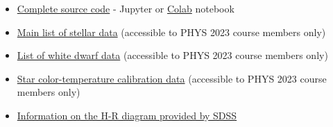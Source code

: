 \documentclass[twocolumn]{aastex63}
\begin{document}
\begin{itemize}
    \item \href{https://drive.google.com/file/d/1skbQMEpihvruBT3py0GIvwL7lylB5EGR/view?usp=sharing}{Complete source code} - Jupyter or \href{https://colab.research.google.com/}{Colab} notebook \citep[requires IPython:][]{IPython}
    \item \href{https://blackboard.gwu.edu/bbcswebdav/pid-9747006-dt-content-rid-65358190_2/xid-65358190_2}{Main list of stellar data} (accessible to PHYS 2023 course members only)
    \item \href{https://blackboard.gwu.edu/bbcswebdav/pid-9747009-dt-content-rid-65358195_2/xid-65358195_2}{List of white dwarf data} (accessible to PHYS 2023 course members only)
    \item \href{https://blackboard.gwu.edu/bbcswebdav/pid-9747011-dt-content-rid-65358198_2/xid-65358198_2}{Star color-temperature calibration data} (accessible to PHYS 2023 course members only)
    \item \href{https://skyserver.sdss.org/dr15/en/proj/advanced/hr/hrhome.aspx}{Information on the H-R diagram provided by SDSS}
\end{itemize}
\end{document}
